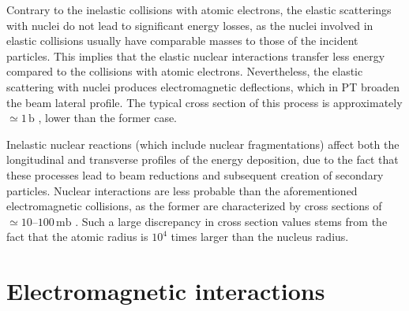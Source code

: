 Contrary to the inelastic collisions with atomic electrons, the elastic scatterings with nuclei do not lead to significant energy losses, as the nuclei involved in elastic collisions usually have comparable masses to those of the incident particles. This implies that the elastic nuclear interactions transfer less energy compared to the collisions with atomic electrons. Nevertheless, the elastic scattering with nuclei produces electromagnetic deflections, which in PT broaden the beam lateral profile. The typical cross section of this process is approximately $\simeq1\,\mathrm{b}$ \cite{slide_spighi}, lower than the former case.

Inelastic nuclear reactions (which include nuclear fragmentations) affect both the longitudinal and transverse profiles of the energy deposition, due to the fact that these processes lead to beam reductions and subsequent creation of secondary particles. Nuclear interactions are less probable than the aforementioned electromagnetic collisions, as the former are characterized by cross sections of $\simeq10$--$100\,\mathrm{mb}$ \cite{slide_spighi}. Such a large discrepancy in cross section values stems from the fact that the atomic radius is $10^4$ times larger than the nucleus radius.
\section{Electromagnetic interactions}\label{sec:em_interactions}
